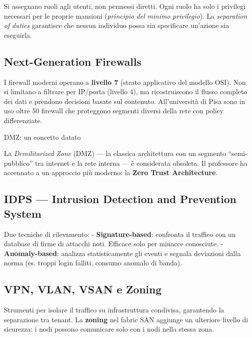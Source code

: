 \documentclass[
  italian,
  openany]{book}
\begin{document}
Si assegnano ruoli agli utenti, non permessi diretti. Ogni ruolo ha solo
i privilegi necessari per le proprie mansioni (\emph{principio del
minimo privilegio}). La \emph{separation of duties} garantisce che
nessun individuo possa sia specificare un'azione sia eseguirla.

\subsection{Next-Generation Firewalls}\label{next-generation-firewalls}

I firewall moderni operano a \textbf{livello 7} (strato applicativo del
modello OSI). Non si limitano a filtrare per IP/porta (livello 4), ma
ricostruiscono il flusso completo dei dati e prendono decisioni basate
sul contenuto. All'università di Pisa sono in uso oltre 50 firewall che
proteggono segmenti diversi della rete con policy differenziate.

\begin{calloutnote}{DMZ: un concetto datato}

La \emph{Demilitarized Zone} (DMZ) --- la classica architettura con un
segmento ``semi-pubblico'' tra internet e la rete interna --- è
considerata obsoleta. Il professore ha accennato a un approccio più
moderno: la \textbf{Zero Trust Architecture}.

\end{calloutnote}

\subsection{IDPS --- Intrusion Detection and Prevention
System}\label{idps-intrusion-detection-and-prevention-system}

Due tecniche di rilevamento: - \textbf{Signature-based}: confronta il
traffico con un database di firme di attacchi noti. Efficace solo per
minacce conosciute. - \textbf{Anomaly-based}: analizza statisticamente
gli eventi e segnala deviazioni dalla norma (es. troppi login falliti,
consumo anomalo di banda).

\subsection{VPN, VLAN, VSAN e Zoning}\label{vpn-vlan-vsan-e-zoning}

Strumenti per isolare il traffico su infrastruttura condivisa,
garantendo la separazione tra tenant. La \textbf{zoning} nel fabric SAN
aggiunge un ulteriore livello di sicurezza: i nodi possono comunicare
solo con i nodi nella stessa zona.
\end{document}
